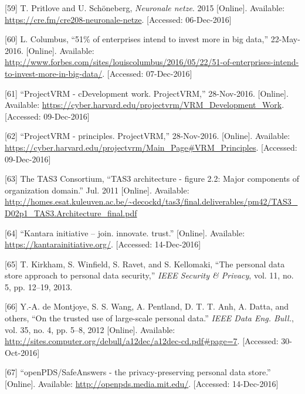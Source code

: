\documentclass[12pt,english,a4paper,titlepage,cleardoublepage=empty,dottedtoc]{report}
\begin{document}
\hypertarget{ref-podcast_2015_cre-neuronale-netze}{}
{[}59{]} T. Pritlove and U. Schöneberg, \emph{Neuronale netze}. 2015
{[}Online{]}. Available: \url{https://cre.fm/cre208-neuronale-netze}.
{[}Accessed: 06-Dec-2016{]}

\hypertarget{ref-web_2016_industries-intention-to-invest-in-big-data}{}
{[}60{]} L. Columbus, ``51\% of enterprises intend to invest more in big
data,'' 22-May-2016. {[}Online{]}. Available:
\url{http://www.forbes.com/sites/louiscolumbus/2016/05/22/51-of-enterprises-intend-to-invest-more-in-big-data/}.
{[}Accessed: 07-Dec-2016{]}

\hypertarget{ref-web_2016_projectvrm_development-work}{}
{[}61{]} ``ProjectVRM - cDevelopment work. ProjectVRM,'' 28-Nov-2016.
{[}Online{]}. Available:
\url{https://cyber.harvard.edu/projectvrm/VRM_Development_Work}.
{[}Accessed: 09-Dec-2016{]}

\hypertarget{ref-web_2016_projectvrm_principles}{}
{[}62{]} ``ProjectVRM - principles. ProjectVRM,'' 28-Nov-2016.
{[}Online{]}. Available:
\url{https://cyber.harvard.edu/projectvrm/Main_Page\#VRM_Principles}.
{[}Accessed: 09-Dec-2016{]}

\hypertarget{ref-graphic_2011_architecture_components-of-organization-domain}{}
{[}63{]} The TAS3 Consortium, ``TAS3 architecture - figure 2.2: Major
components of organization domain.'' Jul. 2011 {[}Online{]}. Available:
\url{http://homes.esat.kuleuven.ac.be/~decockd/tas3/final.deliverables/pm42/TAS3_D02p1_TAS3.Architecture_final.pdf}

\hypertarget{ref-web_kantara-initiative}{}
{[}64{]} ``Kantara initiative -- join. innovate. trust.'' {[}Online{]}.
Available: \url{https://kantarainitiative.org/}. {[}Accessed:
14-Dec-2016{]}

\hypertarget{ref-paper_2014_personal-data-store-approach}{}
{[}65{]} T. Kirkham, S. Winfield, S. Ravet, and S. Kellomaki, ``The
personal data store approach to personal data security,'' \emph{IEEE
Security \& Privacy}, vol. 11, no. 5, pp. 12--19, 2013.

\hypertarget{ref-paper_2012_openpds_on-trusted-use-of-large-scale-personal-data}{}
{[}66{]} Y.-A. de Montjoye, S. S. Wang, A. Pentland, D. T. T. Anh, A.
Datta, and others, ``On the trusted use of large-scale personal data.''
\emph{IEEE Data Eng. Bull.}, vol. 35, no. 4, pp. 5--8, 2012
{[}Online{]}. Available:
\url{http://sites.computer.org/debull/a12dec/a12dec-cd.pdf\#page=7}.
{[}Accessed: 30-Oct-2016{]}

\hypertarget{ref-web_mit_openpds-safeanswers-project-page}{}
{[}67{]} ``openPDS/SafeAnswers - the privacy-preserving personal data
store.'' {[}Online{]}. Available: \url{http://openpds.media.mit.edu/}.
{[}Accessed: 14-Dec-2016{]}
\end{document}
